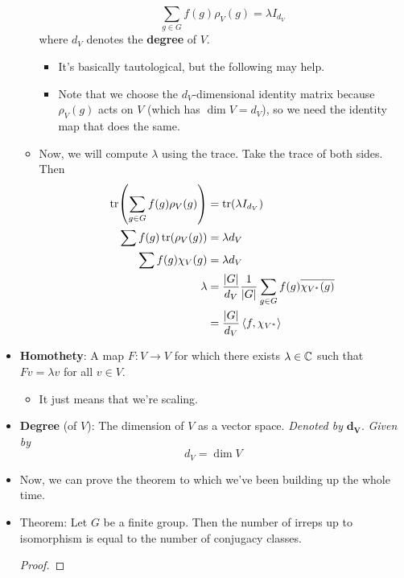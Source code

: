 \documentclass[../notes.tex]{subfiles}
\begin{document}
\begin{itemize}
\begin{itemize}
\begin{equation*}
            \sum_{g\in G}f(g)\rho_V(g)
            = \lambda I_{d_V}
        \end{equation*}
        where $d_V$ denotes the \textbf{degree} of $V$.
        \begin{itemize}
            \item It's basically tautological, but the following may help.
            \item Note that we choose the $d_V$-dimensional identity matrix because $\rho_V(g)$ acts on $V$ (which has $\dim V=d_V$), so we need the identity map that does the same.
        \end{itemize}
        \item Now, we will compute $\lambda$ using the trace. Take the trace of both sides. Then
        \begin{align*}
            \tr(\sum_{g\in G}f(g)\rho_V(g))
            &= \tr(\lambda I_{d_V})\\
            \sum f(g)\tr(\rho_V(g)) &= \lambda d_V\\
            \sum f(g)\chi_V(g) &= \lambda d_V\\
            \lambda &= \frac{|G|}{d_V}\frac{1}{|G|}\sum_{g\in G}f(g)\overline{\chi_{V^*}(g)}\\
            &= \frac{|G|}{d_V}\left\langle{f,\chi_{V^*}}\right\rangle
        \end{align*}
    \end{itemize}
    \item \textbf{Homothety}: A map $F:V\to V$ for which there exists $\lambda\in\mathbb{C}$ such that $Fv=\lambda v$ for all $v\in V$.
    \begin{itemize}
        \item It just means that we're scaling.
    \end{itemize}
    \item \textbf{Degree} (of $V$): The dimension of $V$ as a vector space. \emph{Denoted by} $\bm{d_V}$. \emph{Given by}
    \begin{equation*}
        d_V = \dim V
    \end{equation*}
    \item Now, we can prove the theorem to which we've been building up the whole time.
    \item Theorem: Let $G$ be a finite group. Then the number of irreps up to isomorphism is equal to the number of conjugacy classes.
    \begin{proof}
        

\end{proof}
\end{itemize}
\end{document}
